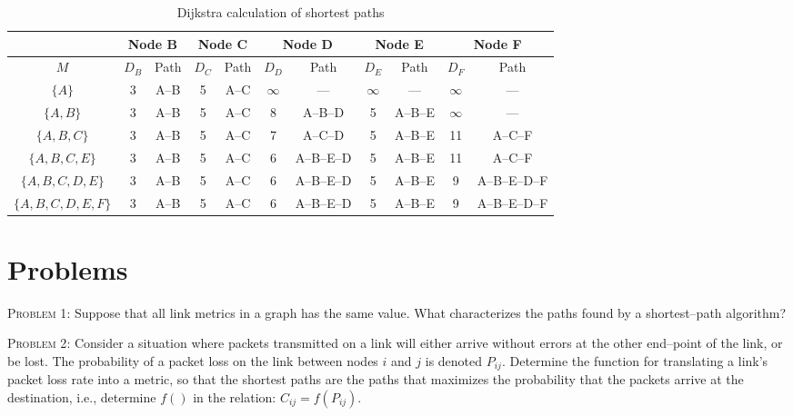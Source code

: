 \documentclass[a4paper]{article}
\newcommand{\ie}{i.e.,\xspace}
\newenvironment{problem}[1]%
{\noindent{}\textsc{Problem #1}: }{\vspace{12pt}}
\begin{document}
\begin{table}[ht]
\centering\begin{tabular}{|c|c|c|c|c|c|c|c|c|c|c|}\hline
 & \multicolumn{2}{|c|}{Node B} & \multicolumn{2}{|c|}{Node C} &
 \multicolumn{2}{|c|}{Node D} & \multicolumn{2}{|c|}{Node E} &
 \multicolumn{2}{|c|}{Node F}  \\ \hline
$M$ & $D_B$ & Path & $D_C$ & Path & $D_D$ & Path & $D_E$ & Path &
$D_F$ & Path \\ \hline
%
$\{A\}$ & 3 & A--B & 5 & A--C & $\infty$ & --- & $\infty$ & --- &
$\infty$ & --- \\ \hline
%
$\{A,B\}$ & 3 & A--B & 5 & A--C & 8 & A--B--D & 5 & A--B--E &
$\infty$ & --- \\ \hline
%
$\{A,B,C\}$ & 3 & A--B & 5 & A--C & 7 & A--C--D & 5 & A--B--E & 11
& A--C--F \\ \hline
%
$\{A,B,C,E\}$ & 3 & A--B & 5 & A--C & 6 & A--B--E--D & 5 & A--B--E
& 11 & A--C--F \\ \hline
%
$\{A,B,C,D,E\}$ & 3 & A--B & 5 & A--C & 6 & A--B--E--D & 5 &
A--B--E & 9 & A--B--E--D--F \\ \hline
%
$\{A,B,C,D,E,F\}$ & 3 & A--B & 5 & A--C & 6 & A--B--E--D & 5 &
A--B--E & 9 & A--B--E--D--F \\ \hline
\end{tabular}
\caption{\label{tbl:dijkstra}Dijkstra calculation of shortest
paths}
\end{table}

\section{Problems}

\begin{problem}{1}
Suppose that all link metrics in a graph has the same value. What
characterizes the paths found by a shortest--path algorithm?
\end{problem}

\begin{problem}{2}
Consider a situation where packets transmitted on a link will
either arrive without errors at the other end--point of the link,
or be lost. The probability of a packet loss on the link between
nodes $i$ and $j$ is denoted $P_{ij}$. Determine the function for
translating a link's packet loss rate into a metric, so that the
shortest paths are the paths that maximizes the probability that
the packets arrive at the destination, \ie determine $f()$ in the
relation: $C_{ij} = f(P_{ij})$.
\end{problem}
\end{document}
